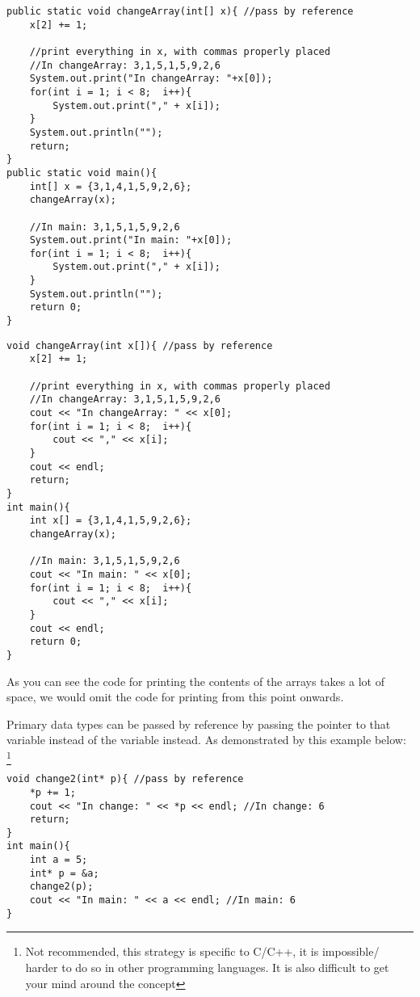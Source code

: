 \if{}
\begin{lstlisting}
public static void changeArray(int[] x){ //pass by reference
    x[2] += 1;
    
    //print everything in x, with commas properly placed
    //In changeArray: 3,1,5,1,5,9,2,6
    System.out.print("In changeArray: "+x[0]);
    for(int i = 1; i < 8;  i++){
        System.out.print("," + x[i]);
    }
    System.out.println("");
    return;
}
public static void main(){
    int[] x = {3,1,4,1,5,9,2,6};
    changeArray(x);
    
    //In main: 3,1,5,1,5,9,2,6
    System.out.print("In main: "+x[0]);
    for(int i = 1; i < 8;  i++){
        System.out.print("," + x[i]);
    }
    System.out.println("");
    return 0;
}
\end{lstlisting}
\else
\begin{lstlisting}
void changeArray(int x[]){ //pass by reference
    x[2] += 1;
    
    //print everything in x, with commas properly placed
    //In changeArray: 3,1,5,1,5,9,2,6
    cout << "In changeArray: " << x[0];
    for(int i = 1; i < 8;  i++){
        cout << "," << x[i];
    }
    cout << endl;
    return;
}
int main(){
    int x[] = {3,1,4,1,5,9,2,6};
    changeArray(x);
    
    //In main: 3,1,5,1,5,9,2,6
    cout << "In main: " << x[0];
    for(int i = 1; i < 8;  i++){
        cout << "," << x[i];
    }
    cout << endl;
    return 0;
}
\end{lstlisting}
\fi

As you can see the code for printing the contents of the arrays takes a lot of space, we would omit the code for printing from this point onwards.

\if{}
\else
Primary data types can be passed by reference by passing the pointer to that variable instead of the variable instead. As demonstrated by this example below: \footnote{Not recommended, this strategy is specific to C/C++, it is impossible/ harder to do so in other programming languages. It is also difficult to get your mind around the concept}

\begin{lstlisting}
void change2(int* p){ //pass by reference
    *p += 1;
    cout << "In change: " << *p << endl; //In change: 6
    return;
}
int main(){
    int a = 5;
    int* p = &a;
    change2(p);
    cout << "In main: " << a << endl; //In main: 6
}
\end{lstlisting}
\fi

